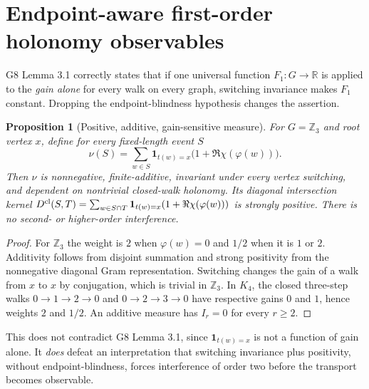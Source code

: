 \documentclass[11pt]{article}
\newtheorem{proposition}[theorem]{Proposition}
\newcommand{\R}{\mathbb R}
\newcommand{\Z}{\mathbb Z}
\begin{document}
\section{Endpoint-aware first-order holonomy observables}
G8 Lemma 3.1 correctly states that if one universal function $F_1:G\to\R$ is applied to the \emph{gain alone} for every walk on every graph, switching invariance makes $F_1$ constant. Dropping the endpoint-blindness hypothesis changes the assertion.
\begin{proposition}[Positive, additive, gain-sensitive measure]\label{prop:additive}
For $G=\Z_3$ and root vertex $x$, define for every fixed-length event $S$
\begin{equation}
\nu(S)=\sum_{w\in S} \mathbf 1_{t(w)=x}\bigl(1+\Re\chi(\varphi(w))\bigr).
\end{equation}
Then $\nu$ is nonnegative, finite-additive, invariant under every vertex switching, and dependent on nontrivial closed-walk holonomy. Its diagonal intersection kernel $D^{\rm cl}(S,T)=\sum_{w\in S\cap T}\mathbf 1_{t(w)=x}(1+\Re\chi(\varphi(w)))$ is strongly positive. There is no second- or higher-order interference.
\end{proposition}
\begin{proof}
For $\Z_3$ the weight is $2$ when $\varphi(w)=0$ and $1/2$ when it is $1$ or $2$. Additivity follows from disjoint summation and strong positivity from the nonnegative diagonal Gram representation. Switching changes the gain of a walk from $x$ to $x$ by conjugation, which is trivial in $\Z_3$. In $K_4$, the closed three-step walks $0\to1\to2\to0$ and $0\to2\to3\to0$ have respective gains $0$ and $1$, hence weights $2$ and $1/2$. An additive measure has $I_r=0$ for every $r\ge2$.
\end{proof}
\noindent This does not contradict G8 Lemma 3.1, since $\mathbf1_{t(w)=x}$ is not a function of gain alone. It \emph{does} defeat an interpretation that switching invariance plus positivity, without endpoint-blindness, forces interference of order two before the transport becomes observable.
\end{document}

